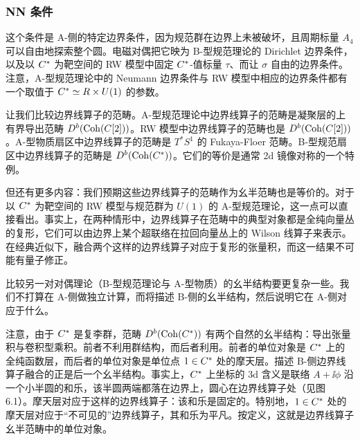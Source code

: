 \subsubsection{NN 条件}

这个条件是 A-侧的特定边界条件，因为规范群在边界上未被破坏，且周期标量 $A_4$ 可以自由地探索整个圆。电磁对偶把它映为 B-型规范理论的 Dirichlet 边界条件，以及以 $C^*$ 为靶空间的 RW 模型中固定 $C^*$-值标量 $\tau$、而让 $\sigma$ 自由的边界条件。注意，A-型规范理论中的 Neumann 边界条件与 RW 模型中相应的边界条件都有一个取值于 $C^*\simeq R\times U(1)$ 的参数。

让我们比较边界线算子的范畴。A-型规范理论中边界线算子的范畴是凝聚层的上有界导出范畴 $D^b(\mathrm{Coh}(C[2]))$。RW 模型中边界线算子的范畴也是 $D^b(\mathrm{Coh}(C[2]))$。A-型物质扇区中边界线算子的范畴是 $T^*S^1$ 的 Fukaya-Floer 范畴。B-型规范扇区中边界线算子的范畴是 $D^b(\mathrm{Coh}(C^*))$。它们的等价是通常 2d 镜像对称的一个特例。

但还有更多内容：我们预期这些边界线算子的范畴作为幺半范畴也是等价的。对于以 $C^*$ 为靶空间的 RW 模型与规范群为 $U(1)$ 的 A-型规范理论，这一点可以直接看出。事实上，在两种情形中，边界线算子在范畴中的典型对象都是全纯向量丛的复形，它们可以由边界上某个超联络在拉回向量丛上的 Wilson 线算子来表示。在经典近似下，融合两个这样的边界线算子对应于复形的张量积，而这一结果不可能有量子修正。

比较另一对对偶理论（B-型规范理论与 A-型物质）的幺半结构要更复杂一些。我们不打算在 A-侧做独立计算，而将描述 B-侧的幺半结构，然后说明它在 A-侧对应于什么。

注意，由于 $C^*$ 是复李群，范畴 $D^b(\mathrm{Coh}(C^*))$ 有两个自然的幺半结构：导出张量积与卷积型乘积。前者不利用群结构，而后者利用。前者的单位对象是 $C^*$ 上的全纯函数层，而后者的单位对象是单位点 $1\in C^*$ 处的摩天层。描述 B-侧边界线算子融合的正是后一个幺半结构。事实上，$C^*$ 上坐标的 3d 含义是联络 $A+\ii\phi$ 沿一个小半圆的和乐，该半圆两端都落在边界上，圆心在边界线算子处（见图 6.1）。摩天层对应于这样的边界线算子：该和乐是固定的。特别地，$1\in C^*$ 处的摩天层对应于“不可见的”边界线算子，其和乐为平凡。按定义，这就是边界线算子幺半范畴中的单位对象。


